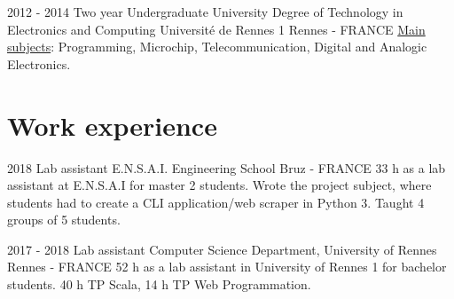\documentclass[11pt,a4paper,sans]{moderncv}        %
\begin{document}
\cventry
	{2012 - 2014}
    {Two year Undergraduate University Degree of Technology in Electronics and Computing}
    {Université de Rennes 1}
    {Rennes - FRANCE}
    {}
    {\underline{Main subjects}: Programming, Microchip, Telecommunication, Digital and Analogic Electronics.}
    
\section{Work experience}

\cventry
	{2018}
	{Lab assistant}
	{E.N.S.A.I. Engineering School}
	{Bruz - FRANCE}
	{}
	{33 h as a lab assistant at E.N.S.A.I for master 2 students.
	Wrote the project subject, where students had to create a CLI application/web scraper in Python 3. Taught 4 groups of 5 students.}

\cventry
	{2017 - 2018}
	{Lab assistant}
	{Computer Science Department, University of Rennes}
	{Rennes - FRANCE}
	{}
	{52 h as a lab assistant in University of Rennes 1 for bachelor students. 40 h TP Scala, 14 h TP Web Programmation.}
\end{document}
